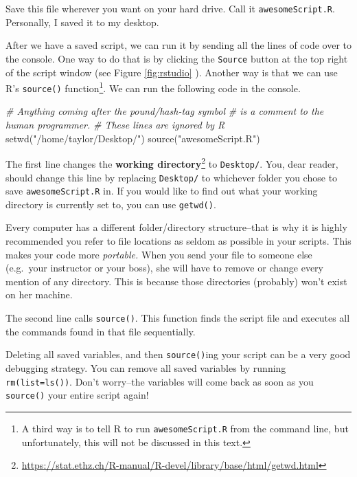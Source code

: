 \documentclass[
  12pt,
  krantz2]{krantz}
\makeatletter
\newenvironment{Shaded}{\begin{snugshade}}{\end{snugshade}}
\newcommand{\CommentTok}[1]{\textcolor[rgb]{0.37,0.37,0.37}{\textit{#1}}}
\newcommand{\FunctionTok}[1]{\textcolor[rgb]{0,0,0}{#1}}
\newcommand{\NormalTok}[1]{#1}
\newcommand{\StringTok}[1]{\textcolor[rgb]{0.5,0.5,0.5}{#1}}
\renewcommand{\href}[2]{#2\footnote{\url{#1}}}
\newenvironment{kframe}{%
\medskip{}
\setlength{\fboxsep}{.8em}
 \def\at@end@of@kframe{}%
 \ifinner\ifhmode%
  \def\at@end@of@kframe{\end{minipage}}%
  \begin{minipage}{\columnwidth}%
 \fi\fi%
 \def\FrameCommand##1{\hskip\@totalleftmargin \hskip-\fboxsep
 \colorbox{shadecolor}{##1}\hskip-\fboxsep
     \hskip-\linewidth \hskip-\@totalleftmargin \hskip\columnwidth}%
 \MakeFramed {\advance\hsize-\width
   \@totalleftmargin\z@ \linewidth\hsize
   \@setminipage}}%
 {\par\unskip\endMakeFramed%
 \at@end@of@kframe}
\renewenvironment{Shaded}{\begin{kframe}}{\end{kframe}}
\makeatother
\begin{document}
Save this file wherever you want on your hard drive. Call it \texttt{awesomeScript.R}. Personally, I saved it to my desktop.

After we have a saved script, we can run it by sending all the lines of code over to the console. One way to do that is by clicking the \texttt{Source} button at the top right of the script window (see Figure \ref{fig:rstudio} ). Another way is that we can use R's \texttt{source()} function\footnote{A third way is to tell R to run \texttt{awesomeScript.R} from the command line, but unfortunately, this will not be discussed in this text.}. We can run the following code in the console.

\begin{Shaded}
\begin{Highlighting}[]
\CommentTok{\# Anything coming after the pound/hash{-}tag symbol }
\CommentTok{\# is a comment to the human programmer.}
\CommentTok{\# These lines are ignored by R}
\FunctionTok{setwd}\NormalTok{(}\StringTok{"/home/taylor/Desktop/"}\NormalTok{)}
\FunctionTok{source}\NormalTok{(}\StringTok{"awesomeScript.R"}\NormalTok{)}
\end{Highlighting}
\end{Shaded}

The first line changes the \href{https://stat.ethz.ch/R-manual/R-devel/library/base/html/getwd.html}{\textbf{working directory}} to \texttt{Desktop/}. You, dear reader, should change this line by replacing \texttt{Desktop/} to whichever folder you chose to save \texttt{awesomeScript.R} in. If you would like to find out what your working directory is currently set to, you can use \texttt{getwd()}.

Every computer has a different folder/directory structure--that is why it is highly recommended you refer to file locations as seldom as possible in your scripts. This makes your code more \emph{portable.} When you send your file to someone else (e.g.~your instructor or your boss), she will have to remove or change every mention of any directory. This is because those directories (probably) won't exist on her machine.

The second line calls \texttt{source()}. This function finds the script file and executes all the commands found in that file sequentially.

Deleting all saved variables, and then \texttt{source()}ing your script can be a very good debugging strategy. You can remove all saved variables by running \texttt{rm(list=ls())}. Don't worry--the variables will come back as soon as you \texttt{source()} your entire script again!
\end{document}
